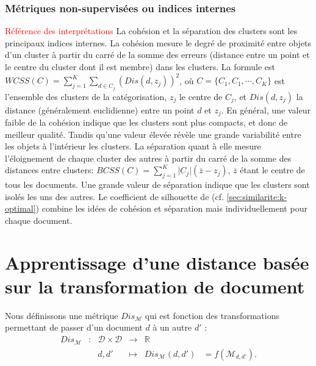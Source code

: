 \subsubsection{Métriques non-supervisées ou indices internes}
\label{sec:similarite:biblio:unsupeval}
\textcolor{red}{Référence des interprétations}
 La cohésion et la séparation des clusters sont les principaux indices internes. La cohésion mesure le degré de proximité entre objets d'un cluster à partir du carré de la somme des erreurs (distance entre un point et le centre du cluster dont il est membre) dans les clusters. La formule est $WCSS(C) = \sum\limits_{j=1}^K\sum\limits_{d \in C_j} (Dis(d, z_j))^2$, où $C = \lbrace C_1, C_1, \cdots, C_K \rbrace$ est l'ensemble des clusters de la catégorisation, $z_j$ le centre de $C_j$, et $Dis(d,z_j)$ la distance (généralement euclidienne) entre un point $d$ et $z_j$. En général, une valeur faible de la cohésion indique que les clusters sont plus compacts, et donc de meilleur qualité. Tandis qu'une valeur élevée révèle une grande variabilité entre les objets à l'intérieur les clusters. La séparation quant à elle mesure l'éloignement de chaque cluster des autres à partir du carré de la somme des distances entre clusters: $BCSS(C) = \sum\limits_{j = 1}^{K} \vert C_j \vert (\overline{z} - z_j)$, 
  $\overline{z}$ étant le centre de tous les documents.
  Une grande valeur de séparation indique que les clusters sont isolés les uns des autres. Le coefficient de silhouette de \citet{rousseeuw1987silhouetteclusternumber} (cf. \ref{sec:similarite:k-optimal})  combine les idées de cohésion et séparation mais individuellement pour chaque document.

\section{Apprentissage d'une distance basée sur la transformation de document}
Nous définissons une métrique $Dis_\mathcal{M}$ qui est fonction des transformations permettant de passer d'un document $d$ à un autre $d'$ :
\begin{equation}
\begin{array}{cccccc}
Dis_\mathcal{M} & : & \mathcal{D} \times \mathcal{D} & \to & \mathbb{R} & \\
& & d, d' & \mapsto & Dis_{\mathcal{M}}(d, d') & = f(\mathcal{M}_{d, d'}). \\
\end{array} \label{eq:similarite:distance-modif}
\end{equation}


